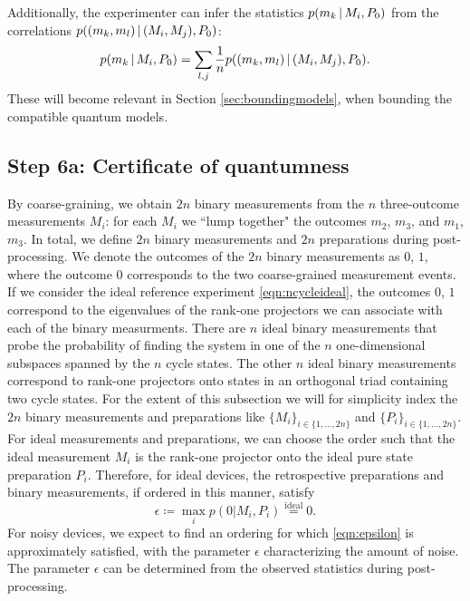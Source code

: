 Additionally, the experimenter can infer the statistics $p(m_k\thinspace\vert\thinspace M_i, P_0)$ from the correlations $p((m_k,m_l)\thinspace\vert\thinspace(M_i,M_j),P_0)$:
\begin{equation*}
p(m_k \thinspace\vert\thinspace M_i, P_0)=\sum_{l,j}\frac{1}{n}p((m_k,m_l)\thinspace\vert\thinspace (M_i,M_j),P_0).
\end{equation*}
These will become relevant in Section \ref{sec:boundingmodels}, when bounding the compatible quantum models.
\subsection{Step 6a: Certificate of quantumness}
\label{sec:certifyquant}
By coarse-graining, we obtain $2n$ binary measurements from the $n$ three-outcome measurements $M_i$: for each $M_i$ we ``lump together" the outcomes $m_2$, $m_3$, and $m_1$, $m_3$. In total, we define $2n$ binary measurements and $2n$ preparations during post-processing. We denote the outcomes of the $2n$ binary measurements as $0$, $1$, where the outcome $0$ corresponds to the two coarse-grained measurement events. If we consider the ideal reference experiment \ref{eqn:ncycleideal}, the outcomes $0$, $1$ correspond to the eigenvalues of the rank-one projectors we can associate with each of the binary measurments. There are $n$ ideal binary measurements that probe the probability of finding the system in one of the $n$ one-dimensional subspaces spanned by the $n$ cycle states. The other $n$ ideal binary measurements correspond to rank-one projectors onto states in an orthogonal triad containing two cycle states. For the extent of this subsection we will for simplicity index the $2n$ binary measurements and preparations like $\{M_i\}_{i\in\{1,\dots,2n\}}$ and $\{P_i\}_{i\in\{1,\dots,2n\}}$. For ideal measurements and preparations, we can choose the order such that the ideal measurement $M_i$ is the rank-one projector onto the ideal pure state preparation $P_i$. Therefore, for ideal devices, the retrospective preparations and binary measurements, if ordered in this manner, satisfy \begin{equation}
\label{eqn:epsilon}
\epsilon \coloneqq \max_i p(0\vert M_i, P_i)\stackrel{\text{ideal}}{=}0.
\end{equation} 
For noisy devices, we expect to find an ordering for which \ref{eqn:epsilon} is approximately satisfied, with the parameter $\epsilon$ characterizing the amount of noise. The parameter $\epsilon$ can be determined from the observed statistics during post-processing.

